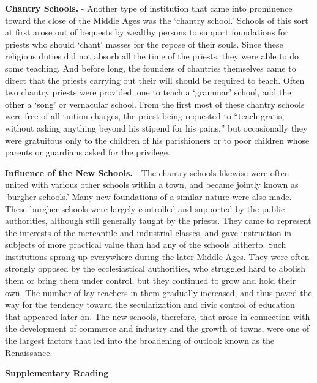 \documentclass[]{book}
\begin{document}
\textbf{Chantry Schools.} - Another type of institution that came into prominence toward the close of the Middle Ages was the `chantry school.' Schools of this sort at first arose out of bequests by wealthy persons to support foundations for priests who should `chant' masses for the repose of their souls. Since these religious duties did not absorb all the time of the priests, they were able to do some teaching. And before long, the founders of chantries themselves came to direct that the priests carrying out their will should be required to teach. Often two chantry priests were provided, one to teach a `grammar' school, and the other a `song' or vernacular school. From the first most of these chantry schools were free of all tuition charges, the priest being requested to ``teach gratis, without asking anything beyond his stipend for his pains,'' but occasionally they were gratuitous only to the children of his parishioners or to poor children whose parents or guardians asked for the privilege.

\textbf{Influence of the New Schools.} - The chantry schools likewise were often united with various other schools within a town, and became jointly known as `burgher schools.' Many new foundations of a similar nature were also made. These burgher schools were largely controlled and supported by the public authorities, although still generally taught by the priests. They came to represent the interests of the mercantile and industrial classes, and gave instruction in subjects of more practical value than had any of the schools hitherto. Such institutions sprang up everywhere during the later Middle Ages. They were often strongly opposed by the ecclesiastical authorities, who struggled hard to abolish them or bring them under control, but they continued to grow and hold their own. The number of lay teachers in them gradually increased, and thus paved the way for the tendency toward the secularization and civic control of education that appeared later on. The new schools, therefore, that arose in connection with the development of commerce and industry and the growth of towns, were one of the largest factors that led into the broadening of outlook known as the Renaissance.

\textbf{Supplementary Reading}
\end{document}
